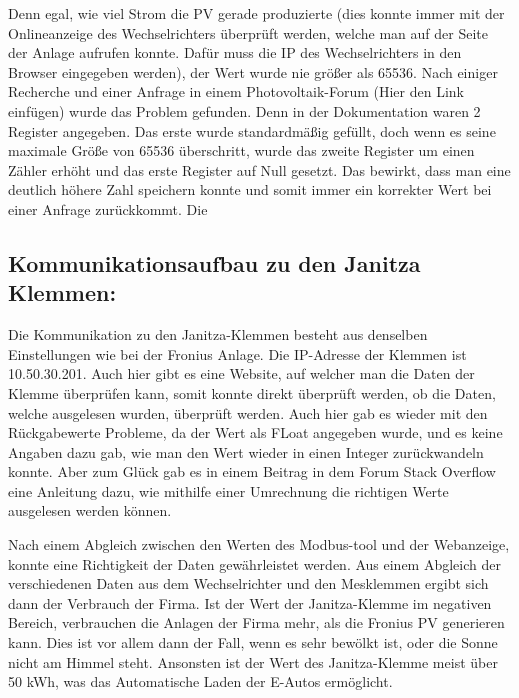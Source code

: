 Denn egal, wie viel Strom die PV gerade produzierte (dies konnte immer mit der Onlineanzeige des Wechselrichters überprüft werden, welche man auf der Seite der Anlage aufrufen konnte. Dafür muss die IP des Wechselrichters in den Browser eingegeben werden), der Wert wurde nie größer als 65536. Nach einiger Recherche und einer Anfrage in einem Photovoltaik-Forum (Hier den Link einfügen) wurde das Problem gefunden. Denn in der Dokumentation waren 2 Register angegeben. Das erste wurde standardmäßig gefüllt, doch wenn es seine maximale Größe von 65536 überschritt, wurde das zweite Register um einen Zähler erhöht und das erste Register auf Null gesetzt. Das bewirkt, dass man eine deutlich höhere Zahl speichern konnte und somit immer ein korrekter Wert bei einer Anfrage zurückkommt. Die  

\subsection{Kommunikationsaufbau zu den Janitza Klemmen: }

Die Kommunikation zu den Janitza-Klemmen besteht aus denselben Einstellungen wie bei der Fronius Anlage. Die IP-Adresse der Klemmen ist 10.50.30.201. Auch hier gibt es eine Website, auf welcher man die Daten der Klemme überprüfen kann, somit konnte direkt überprüft werden, ob die Daten, welche ausgelesen wurden, überprüft werden. Auch hier gab es wieder mit den Rückgabewerte Probleme, da der Wert als FLoat angegeben wurde, und es keine Angaben dazu gab, wie man den Wert wieder in einen Integer zurückwandeln konnte. Aber zum Glück gab es in einem Beitrag in dem Forum Stack Overflow eine Anleitung dazu, wie mithilfe einer Umrechnung die richtigen Werte ausgelesen werden können.  

Nach einem Abgleich zwischen den Werten des Modbus-tool und der Webanzeige, konnte eine Richtigkeit der Daten gewährleistet werden. Aus einem Abgleich der verschiedenen Daten aus dem Wechselrichter und den Mesklemmen ergibt sich dann der Verbrauch der Firma. Ist der Wert der Janitza-Klemme im negativen Bereich, verbrauchen die Anlagen der Firma mehr, als die Fronius PV generieren kann. Dies ist vor allem dann der Fall, wenn es sehr bewölkt ist, oder die Sonne nicht am Himmel steht. Ansonsten ist der Wert des Janitza-Klemme meist über 50 kWh, was das Automatische Laden der E-Autos ermöglicht.  

